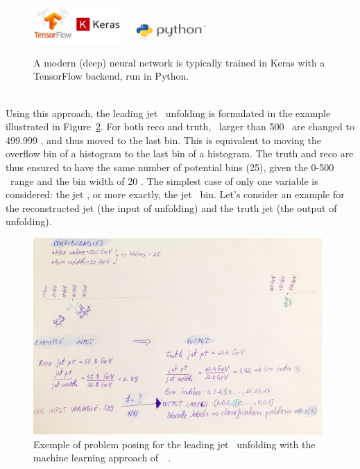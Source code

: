 \begin{figure}[h]
  \centering
  \includegraphics[width=0.30\textwidth]{../presentation/plots/TensorFlow_Keras.png}
  \includegraphics[width=0.30\textwidth]{../presentation/plots/Python.png}
  \caption{A modern (deep) neural network is typically trained in Keras with a TensorFlow backend, run in Python.}
  \label{fig:CodeSoftware}
\end{figure}

\ \\Using this approach, the leading jet \pt~unfolding is formulated in the example illustrated in Figure~\ref{fig:PhysicsProblem}. For both reco and truth, \pt~larger than 500 \GeV~are changed to 499.999 \GeV, and thus moved to the last bin. This is equivalent to moving the overflow bin of a histogram to the last bin of a histogram. The truth and reco are thus ensured to have the same number of potential bins (25), given the 0-500 \GeV~range and the bin width of 20 \GeV. The simplest case of only one variable is considered: the jet \pt, or more exactly, the jet \pt~bin. Let's consider an example for the reconstructed jet (the input of unfolding) and the truth jet (the output of unfolding).

\begin{figure}[h]
  \centering
  \includegraphics[width=0.98\textwidth]{../presentation/plots/PhysicsProblem.jpg}
  \caption{Exemple of problem posing for the leading jet \pt~unfolding with the machine learning approach of~\cite{AGlazov}~\cite{AGlazovCode}.}
  \label{fig:PhysicsProblem}
\end{figure}

